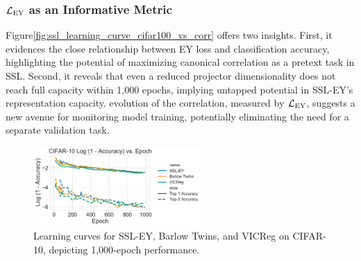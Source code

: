 \subsubsection{$\mathcal{L}_\text{EY}$ as an Informative Metric} Figure\ref{fig:ssl_learning_curve_cifar100_vs_corr} offers two insights.
First, it evidences the close relationship between EY loss and classification accuracy, highlighting the potential of maximizing canonical correlation as a pretext task in SSL. Second, it reveals that even a reduced projector dimensionality does not reach full capacity within 1,000 epochs, implying untapped potential in SSL-EY's representation capacity.
evolution of the correlation, measured by $\mathcal{L}_\text{EY}$, suggests a new avenue for monitoring model training, potentially eliminating the need for a separate validation task.

\begin{figure}[H]
    \centering
    \includegraphics[width=0.57\textwidth]{figures/SSL/cifar10_learning_curve_log_error}
    \caption{Learning curves for SSL-EY, Barlow Twins, and VICReg on CIFAR-10, depicting 1,000-epoch performance.}
    \label{fig:ssl_learning_curve_cifar10_top5}
\end{figure}

